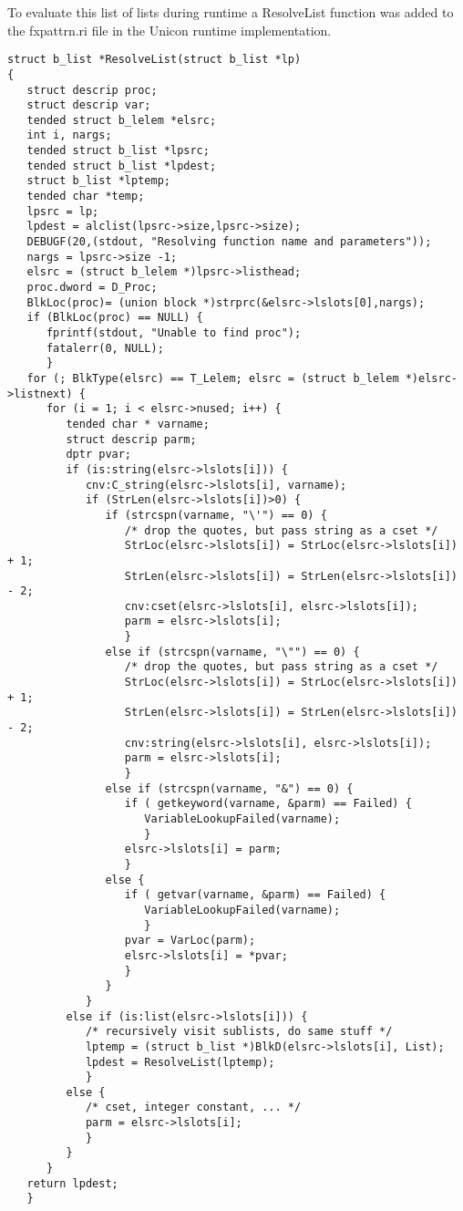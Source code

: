 \documentclass{article}
\begin{document}
To evaluate this list of lists during runtime a ResolveList function was added to the fxpattrn.ri file in the Unicon runtime implementation.  
\begin{verbatim}
struct b_list *ResolveList(struct b_list *lp)
{
   struct descrip proc;
   struct descrip var;
   tended struct b_lelem *elsrc;
   int i, nargs;
   tended struct b_list *lpsrc;
   tended struct b_list *lpdest;
   struct b_list *lptemp;
   tended char *temp;
   lpsrc = lp;
   lpdest = alclist(lpsrc->size,lpsrc->size);
   DEBUGF(20,(stdout, "Resolving function name and parameters"));
   nargs = lpsrc->size -1;
   elsrc = (struct b_lelem *)lpsrc->listhead;
   proc.dword = D_Proc;
   BlkLoc(proc)= (union block *)strprc(&elsrc->lslots[0],nargs);
   if (BlkLoc(proc) == NULL) {
      fprintf(stdout, "Unable to find proc");
      fatalerr(0, NULL);
      }
   for (; BlkType(elsrc) == T_Lelem; elsrc = (struct b_lelem *)elsrc->listnext) {
      for (i = 1; i < elsrc->nused; i++) {
         tended char * varname;
         struct descrip parm;
         dptr pvar;
         if (is:string(elsrc->lslots[i])) {
            cnv:C_string(elsrc->lslots[i], varname);
            if (StrLen(elsrc->lslots[i])>0) {
               if (strcspn(varname, "\'") == 0) { 
                  /* drop the quotes, but pass string as a cset */
                  StrLoc(elsrc->lslots[i]) = StrLoc(elsrc->lslots[i]) + 1;
                  StrLen(elsrc->lslots[i]) = StrLen(elsrc->lslots[i]) - 2;
                  cnv:cset(elsrc->lslots[i], elsrc->lslots[i]);
                  parm = elsrc->lslots[i];
                  }
               else if (strcspn(varname, "\"") == 0) {
                  /* drop the quotes, but pass string as a cset */
                  StrLoc(elsrc->lslots[i]) = StrLoc(elsrc->lslots[i]) + 1;
                  StrLen(elsrc->lslots[i]) = StrLen(elsrc->lslots[i]) - 2;
                  cnv:string(elsrc->lslots[i], elsrc->lslots[i]);
                  parm = elsrc->lslots[i];
                  }
               else if (strcspn(varname, "&") == 0) {
                  if ( getkeyword(varname, &parm) == Failed) {
                     VariableLookupFailed(varname);
                     }
                  elsrc->lslots[i] = parm;
                  }
               else {
                  if ( getvar(varname, &parm) == Failed) {
                     VariableLookupFailed(varname);
                     }
                  pvar = VarLoc(parm);
                  elsrc->lslots[i] = *pvar;
                  }
               }
            }
         else if (is:list(elsrc->lslots[i])) {
            /* recursively visit sublists, do same stuff */
            lptemp = (struct b_list *)BlkD(elsrc->lslots[i], List);
            lpdest = ResolveList(lptemp);
            }
         else { 
            /* cset, integer constant, ... */
            parm = elsrc->lslots[i];
            }
         }
      }
   return lpdest;
   }
\end{verbatim}
\end{document}
